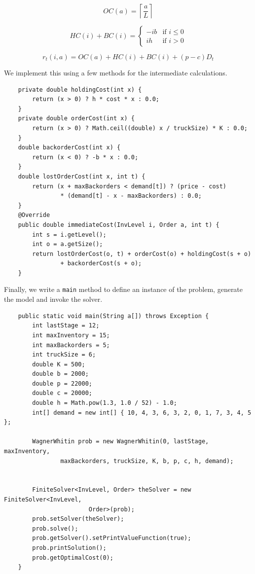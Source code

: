 \documentclass[11pt]{article}
\begin{document}
\begin{enumerate}
  \begin{equation*}
    OC(a)=      \left\lceil \frac{a}{L}\right\rceil  
  \end{equation*}

  \begin{equation*}HC(i)+BC(i)=\left\{
    \begin{array}{cc}
      -ib & \textrm{if $i \le 0$}\\
      ih & \textrm{if $i > 0$}
    \end{array} \right.
  \end{equation*}


  \[r_t(i,a)= OC(a) + HC(i) + BC(i) + (p-c)D_t\]
\end{enumerate}

We implement this using a few methods for the intermediate calculations.
  \begin{lstlisting}
    private double holdingCost(int x) {
        return (x > 0) ? h * cost * x : 0.0;
    } 
    private double orderCost(int x) {
        return (x > 0) ? Math.ceil((double) x / truckSize) * K : 0.0;
    } 
    double backorderCost(int x) {
        return (x < 0) ? -b * x : 0.0;
    }
    double lostOrderCost(int x, int t) {
        return (x + maxBackorders < demand[t]) ? (price - cost)
                * (demand[t] - x - maxBackorders) : 0.0;
    }
    @Override
    public double immediateCost(InvLevel i, Order a, int t) {
        int s = i.getLevel();
        int o = a.getSize();
        return lostOrderCost(o, t) + orderCost(o) + holdingCost(s + o)
                + backorderCost(s + o);
    }
  \end{lstlisting}

Finally, we write a \lstinline!main! method to define an instance of the problem, generate the model and invoke the solver.

  \begin{lstlisting}
    public static void main(String a[]) throws Exception {
        int lastStage = 12;
        int maxInventory = 15;
        int maxBackorders = 5;
        int truckSize = 6;
        double K = 500;
        double b = 2000;
        double p = 22000;
        double c = 20000;
        double h = Math.pow(1.3, 1.0 / 52) - 1.0;
        int[] demand = new int[] { 10, 4, 3, 6, 3, 2, 0, 1, 7, 3, 4, 5 };

        WagnerWhitin prob = new WagnerWhitin(0, lastStage, maxInventory,
                maxBackorders, truckSize, K, b, p, c, h, demand);
         

        FiniteSolver<InvLevel, Order> theSolver = new FiniteSolver<InvLevel, 
        				Order>(prob);
        prob.setSolver(theSolver);
        prob.solve();
        prob.getSolver().setPrintValueFunction(true);
        prob.printSolution();
        prob.getOptimalCost(0);
    }
\end{lstlisting}
\end{document}
